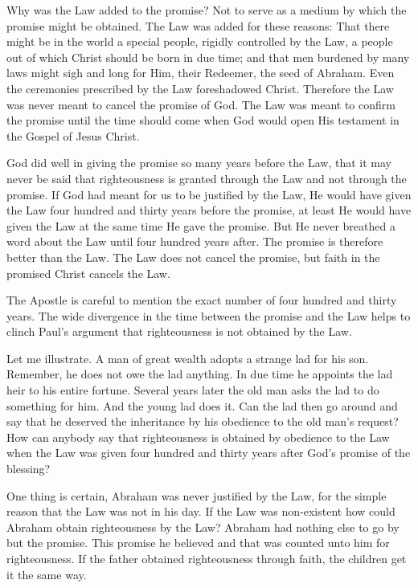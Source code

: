 Why was the Law added to the promise? Not to serve as a medium by which the promise might be obtained. The Law was added for these reasons: That there might be in the world a special people, rigidly controlled by the Law, a people out of which Christ should be born in due time; and that men burdened by many laws might sigh and long for Him, their Redeemer, the seed of Abraham. Even the ceremonies prescribed by the Law foreshadowed Christ. Therefore the Law was never meant to cancel the promise of God. The Law was meant to confirm the promise until the time should come when God would open His testament in the Gospel of Jesus Christ.

God did well in giving the promise so many years before the Law, that it may never be said that righteousness is granted through the Law and not through the promise. If God had meant for us to be justified by the Law, He would have given the Law four hundred and thirty years before the promise, at least He would have given the Law at the same time He gave the promise. But He never breathed a word about the Law until four hundred years after. The promise is therefore better than the Law. The Law does not cancel the promise, but faith in the promised Christ cancels the Law.

The Apostle is careful to mention the exact number of four hundred and thirty years. The wide divergence in the time between the promise and the Law helps to clinch Paul’s argument that righteousness is not obtained by the Law.

Let me illustrate. A man of great wealth adopts a strange lad for his son. Remember, he does not owe the lad anything. In due time he appoints the lad heir to his entire fortune. Several years later the old man asks the lad to do something for him. And the young lad does it. Can the lad then go around and say that he deserved the inheritance by his obedience to the old man’s request? How can anybody say that righteousness is obtained by obedience to the Law when the Law was given four hundred and thirty years after God’s promise of the blessing?

One thing is certain, Abraham was never justified by the Law, for the simple reason that the Law was not in his day. If the Law was non-existent how could Abraham obtain righteousness by the Law? Abraham had nothing else to go by but the promise. This promise he believed and that was counted unto him for righteousness. If the father obtained righteousness through faith, the children get it the same way.

